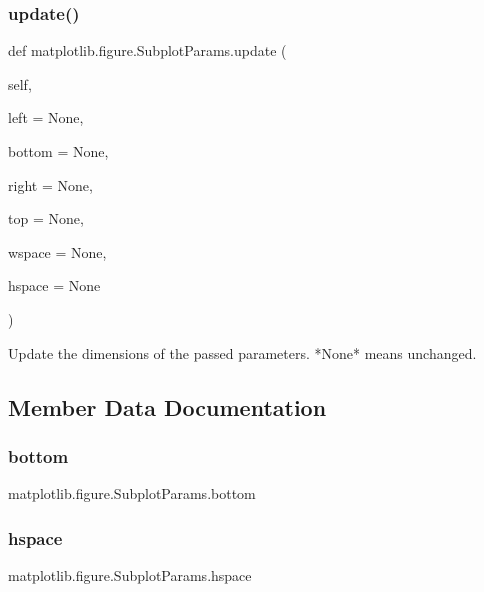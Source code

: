 \subsubsection{\texorpdfstring{update()}{update()}}
{\footnotesize\ttfamily def matplotlib.\+figure.\+Subplot\+Params.\+update (\begin{DoxyParamCaption}\item[{}]{self,  }\item[{}]{left = {\ttfamily None},  }\item[{}]{bottom = {\ttfamily None},  }\item[{}]{right = {\ttfamily None},  }\item[{}]{top = {\ttfamily None},  }\item[{}]{wspace = {\ttfamily None},  }\item[{}]{hspace = {\ttfamily None} }\end{DoxyParamCaption})}

\begin{DoxyVerb}Update the dimensions of the passed parameters. *None* means unchanged.
\end{DoxyVerb}
 

\subsection{Member Data Documentation}
\mbox{\label{classmatplotlib_1_1figure_1_1SubplotParams_a8f8adf624143b057e6ab108e3e1cac17}} 
\subsubsection{\texorpdfstring{bottom}{bottom}}
{\footnotesize\ttfamily matplotlib.\+figure.\+Subplot\+Params.\+bottom}

\mbox{\label{classmatplotlib_1_1figure_1_1SubplotParams_a110507b89d5bc6d1d04ab28a6be122d9}} 
\subsubsection{\texorpdfstring{hspace}{hspace}}
{\footnotesize\ttfamily matplotlib.\+figure.\+Subplot\+Params.\+hspace}

